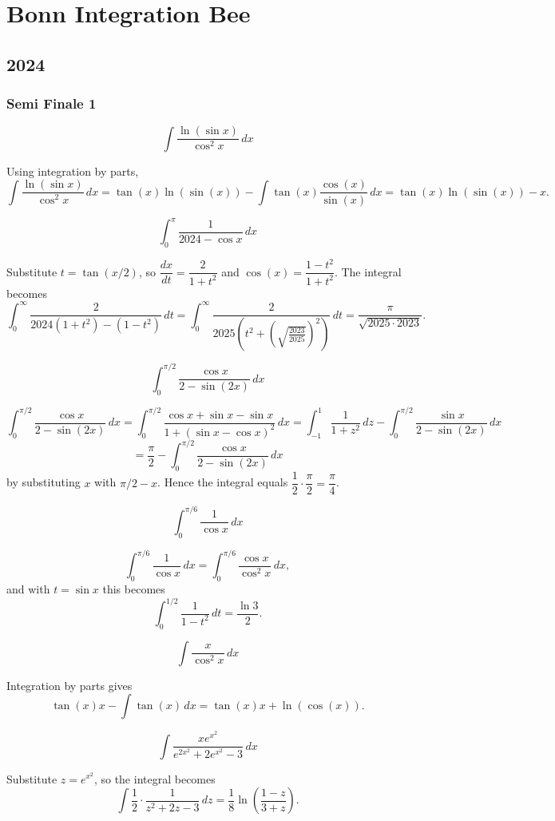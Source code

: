 \section{Bonn Integration Bee}

\subsection*{2024}

\subsubsection*{Semi Finale 1}
\begin{questions}

\question
\[ \int \frac{\ln(\sin x)}{\cos^2 x}\, dx \]
\begin{solution}
Using integration by parts,
\[ \int \frac{\ln(\sin x)}{\cos^2 x}\, dx = \tan(x)\ln(\sin(x)) - \int \tan(x)\frac{\cos(x)}{\sin(x)}\, dx = \tan(x)\ln(\sin(x)) - x. \]
\end{solution}

\question
\[ \int_0^{\pi} \frac{1}{2024-\cos x}\, dx \]
\begin{solution}
Substitute $t=\tan(x/2)$, so $\dfrac{dx}{dt}=\dfrac{2}{1+t^2}$ and $\cos(x)=\dfrac{1-t^2}{1+t^2}$. The integral becomes
\[ \int_0^\infty \frac{2}{2024(1+t^2)-(1-t^2)}\, dt = \int_0^\infty \frac{2}{2025\left(t^2+\left(\sqrt{\tfrac{2023}{2025}}\right)^2\right)}\, dt = \frac{\pi}{\sqrt{2025\cdot 2023}}. \]
\end{solution}

\question
\[ \int_0^{\pi/2} \frac{\cos x}{2-\sin(2x)}\, dx \]
\begin{solution}
\[ \int_0^{\pi/2} \frac{\cos x}{2-\sin(2x)}\, dx = \int_0^{\pi/2} \frac{\cos x+\sin x-\sin x}{1+(\sin x-\cos x)^2}\, dx = \int_{-1}^1 \frac{1}{1+z^2}\, dz - \int_0^{\pi/2} \frac{\sin x}{2-\sin(2x)}\, dx \]
\[ = \frac{\pi}{2} - \int_0^{\pi/2} \frac{\cos x}{2-\sin(2x)}\, dx \]
by substituting $x$ with $\pi/2-x$. Hence the integral equals $\dfrac{1}{2}\cdot\dfrac{\pi}{2}=\dfrac{\pi}{4}$.
\end{solution}

\question
\[ \int_0^{\pi/6} \frac{1}{\cos x}\, dx \]
\begin{solution}
\[ \int_0^{\pi/6} \frac{1}{\cos x}\, dx = \int_0^{\pi/6} \frac{\cos x}{\cos^2 x}\, dx, \]
and with $t=\sin x$ this becomes
\[ \int_0^{1/2} \frac{1}{1-t^2}\, dt = \frac{\ln 3}{2}. \]
\end{solution}

\question
\[ \int \frac{x}{\cos^2 x}\, dx \]
\begin{solution}
Integration by parts gives
\[ \tan(x)x - \int \tan(x)\, dx = \tan(x)x + \ln(\cos(x)). \]
\end{solution}

\question[Tiebreaker]
\[ \int \frac{xe^{x^2}}{e^{2x^2}+2e^{x^2}-3}\, dx \]
\begin{solution}
Substitute $z=e^{x^2}$, so the integral becomes
\[ \int \frac{1}{2}\cdot\frac{1}{z^2+2z-3}\, dz = \frac{1}{8}\ln\left(\frac{1-z}{3+z}\right). \]
\end{solution}

\end{questions}

